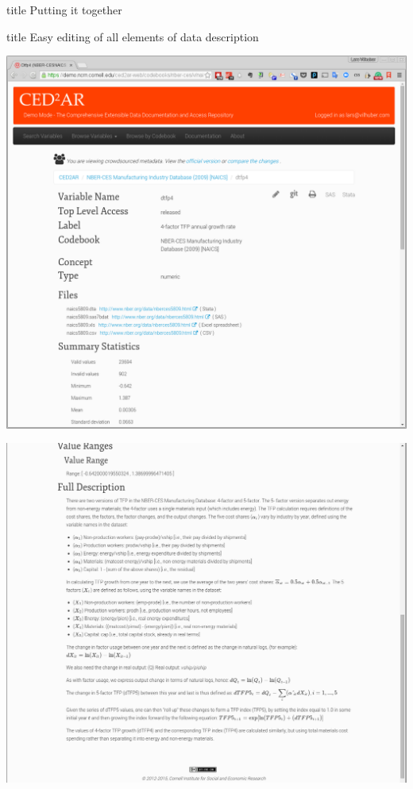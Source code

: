 \begin{frame}
\begin{beamercolorbox}[sep=8pt,center]{title}
	Putting it together
\end{beamercolorbox}
\end{frame}


\begin{frame}
	\begin{beamercolorbox}[sep=8pt,center]{title}
		Easy editing of all elements of data description
	\end{beamercolorbox}
\end{frame}

\begin{frame}
	\centering		
	\includegraphics[height=\textheight]{Selection_133}
\end{frame}

\begin{frame}
	\centering		
	\includegraphics[height=\textheight]{Selection_134}
\end{frame}

